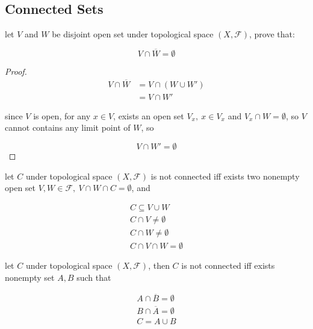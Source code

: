 \subsection{Connected Sets}

\begin{thm}
    let $V$ and $W$ be disjoint open set under topological space $(X, \mathscr{F})$, prove that:

    \[
        V \cap \overline{W} = \emptyset
    \]
\end{thm}

\begin{proof}
    \begin{align*}
        V \cap \overline{W} &= V \cap (W \cup W') \\
        & = V \cap W'
    \end{align*}

    since $V$ is open, for any $x \in V$, exists an open set $V_x,\: x \in V_x$ and $V_x \cap W = \emptyset$, so $V$
    cannot contains any limit point of $W$, so 

    \[
        V \cap W' = \emptyset
    \]
\end{proof}

\begin{definition}
    let $C$ under topological space $(X, \mathscr{F})$ is not connected iff exists two nonempty open set $V, W \in \mathscr{F},\: V \cap W \cap C = \emptyset$, and

    \begin{align*}
        C \subseteq V \cup W \\
        C \cap V \ne \emptyset \\ 
        C \cap W \ne \emptyset \\ 
        C \cap V \cap W = \emptyset
    \end{align*}
\end{definition}

\begin{thm}
    let $C$ under topological space $(X, \mathscr{F})$, then $C$ is not connected iff exists nonempty set $A, B$  such that

    \begin{align*}
        A \cap \overline{B} = \emptyset \\
        B \cap \overline{A} = \emptyset \\
        C = A \cup B
    \end{align*}
\end{thm}


